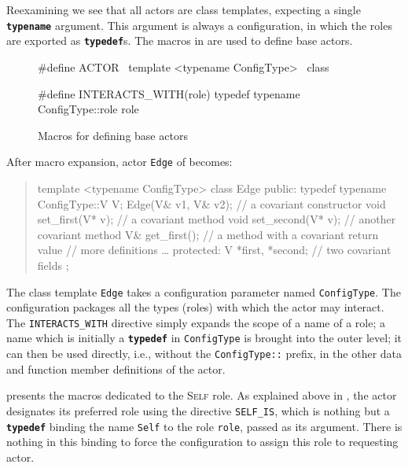 \documentclass[11pt]{article}
\numberwithin{figure}{section}
\newcommand{\kw}[1]{\texttt{\textbf{#1}}}
\newcommand{\cd}[1]{\texttt{#1}}
\newenvironment{excerpt}{\begin{quote}\begin{minipage}\textwidth}{\end{minipage}\end{quote}}
\begin{document}
Reexamining  we see that all actors
    are class templates, expecting a single \kw{typename} argument.
This argument is always a configuration, in which the roles are
    exported as \kw{typedef}s.
The macros in 
    are used to define base actors.

\begin{figure}[!htb]
\CPP
#define ACTOR \
    template <typename ConfigType> \
        class

#define INTERACTS_WITH(role) typedef typename ConfigType::role role
\END\PROGce{}%
\caption{Macros for defining base actors}
\label{Figure:actor:macros}
\end{figure}


After macro expansion, actor \cd{Edge} of  becomes:
\begin{excerpt}
\CPP
template <typename ConfigType>
    class Edge { public:
        typedef typename ConfigType::V V;
        Edge(V& v1, V& v2);            // a covariant constructor
        void set_first(V* v);          // a covariant method
        void set_second(V* v);         // another covariant method
        V& get_first();                // a method with a covariant return value
        //{} more definitions \ldots
        protected: V *first, *second;  // two covariant fields
    };
\END\PROGcf{}
\end{excerpt}
The class template \cd{Edge} takes a configuration
    parameter named \cd{ConfigType}.
The configuration packages all the types (roles) with
    which the actor may interact.
The \cd{INTERACTS\_WITH} directive simply
    expands the scope of a name of a role; a name which is
        initially a \kw{typedef} in \cd{ConfigType} is brought
        into the outer level; it can then be used directly, i.e., without
            the \cd{ConfigType::} prefix, in the other data and function member
            definitions of the actor.

 presents the macros
    dedicated to the \textsc{Self} role.
As explained above in ,
    the actor designates its preferred role using
    the directive \cd{SELF\_IS}, which is nothing but
    a \kw{typedef} binding the name \cd{Self} to the role
    \cd{role}, passed as its argument.
There is nothing in this binding to force the configuration
    to assign this role to requesting actor.
\end{document}
